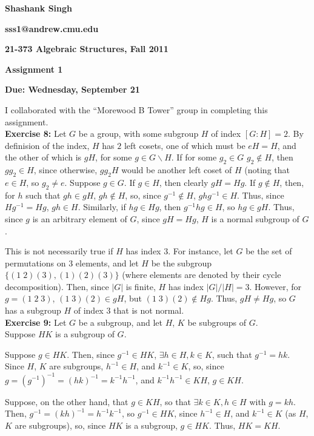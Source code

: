 \documentclass{article}%
\begin{document}
\begin{center}
\textbf{Shashank Singh}

\textbf{sss1@andrew.cmu.edu}

\textbf{21-373 \quad Algebraic Structures, Fall 2011}

\textbf{Assignment 1}

\textbf{Due: Wednesday, September 21}\\
\end{center}

I collaborated with the ``Morewood B Tower'' group in completing this
assignment.\\

\textbf{Exercise 8:} Let $G$ be a group, with some subgroup $H$ of index
$[G:H] = 2$. By definision of the index, $H$ has $2$ left cosets, one of which
must be $eH = H$, and the other of which is $gH$, for some $g \in G
\backslash H$. If for some $g_2 \in G$ $g_2 \not \in H$, then $gg_2 \in H$,
since otherwise, $gg_2H$ would be another left coset of $H$ (noting that
$e \in H$, so $g_2 \neq e$. Suppose $g \in G$. If $g \in H$,
then clearly $gH = Hg$. If $g \not \in H$, then, for $h$ such that $gh \in gH$,
$gh \not \in H$, so, since $g^{-1} \not \in H$, $ghg^{-1} \in H$. Thus,
since $Hg^{-1} = Hg$, $gh \in H$. Similarly, if $hg \in Hg$, then
$g^{-1}hg \in H$, so $hg \in gH$. Thus, since $g$ is an arbitrary element of
$G$, since $gH = Hg$, $H$ is a normal subgroup of $G$.

This is not necessarily true if $H$ has index $3$. For instance, let $G$ be the
set of permutations on $3$ elements, and let $H$ be the subgroup
$\{(1\;2)(3), (1)(2)(3)\}$ (where elements are denoted by their cycle
decomposition). Then, since $|G|$ is finite, $H$ has index $|G|/|H| = 3$.
However, for $g = (1\;2\;3)$, $(1\;3)(2) \in gH$, but $(1\;3)(2) \not \in Hg$.
Thus, $gH \neq Hg$, so $G$ has a subgroup $H$ of index $3$ that is not
normal.\\

\textbf{Exercise 9:} Let $G$ be a subgroup, and let $H$, $K$ be subgroups of
$G$. \\

Suppose $HK$ is a subgroup of $G$.

Suppose $g \in HK$. Then, since
$g^{-1} \in HK$, $\exists h \in H, k \in K$, such that $g^{-1} = hk$. Since $H$,
$K$ are subgroups, $h^{-1} \in H$, and $k^{-1} \in K$, so, since $g =
(g^{-1})^{-1} = (hk)^{-1} = k^{-1}h^{-1}$, and $k^{-1}h^{-1} \in KH$,
$g \in KH$.\

Suppose, on the other hand, that $g \in KH$, so that $\exists
k \in K, h \in H$ with $g = kh$. Then, $g^{-1} = (kh)^{-1} = h^{-1}k^{-1}$,
so $g^{-1} \in HK$, since $h^{-1} \in H$, and $k^{-1} \in K$ (as $H$,$K$ are
subgroups), so, since $HK$ is a subgroup, $g \in HK$. Thus, $HK = KH$.\\
\end{document}
